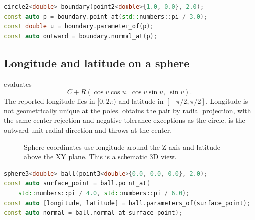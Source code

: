 \begin{lstlisting}[language=C++]
circle2<double> boundary(point2<double>{1.0, 0.0}, 2.0);
const auto p = boundary.point_at(std::numbers::pi / 3.0);
const double u = boundary.parameter_of(p);
const auto outward = boundary.normal_at(p);
\end{lstlisting}

\subsection{Longitude and latitude on a sphere}

 evaluates
\[
 C+R(\cos v\cos u,\ \cos v\sin u,\ \sin v).
\]
The reported longitude lies in $[0,2\pi)$ and latitude in
$[-\pi/2,\pi/2]$. Longitude is not geometrically unique at the poles.
 obtains the pair by radial
projection, with the same center rejection and negative-tolerance exceptions
as the circle.  is the outward unit radial direction
and throws at the center.

\begin{figure}[htbp]
\centering
{}
\caption{Sphere coordinates use longitude around the Z axis and latitude
above the XY plane. This is a schematic 3D view.}
\end{figure}

\begin{lstlisting}[language=C++]
sphere3<double> ball(point3<double>{0.0, 0.0, 0.0}, 2.0);
const auto surface_point = ball.point_at(
    std::numbers::pi / 4.0, std::numbers::pi / 6.0);
const auto [longitude, latitude] = ball.parameters_of(surface_point);
const auto normal = ball.normal_at(surface_point);
\end{lstlisting}

